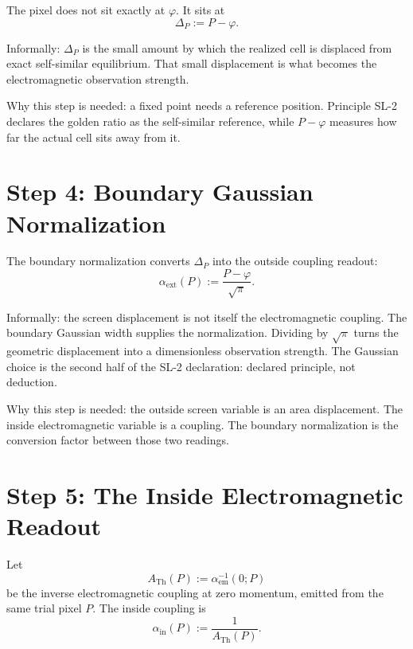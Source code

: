 \documentclass[11pt]{article}
\theoremstyle{remark}
\newcommand{\ATh}{A_{\mathrm{Th}}}
\begin{document}
The pixel does not sit exactly at \(\varphi\). It sits at
\begin{equation}
\Delta_P:=P-\varphi.
\label{eq:deltaP}
\end{equation}

Informally: \(\Delta_P\) is the small amount by which the realized cell is displaced from exact self-similar equilibrium. That small displacement is what becomes the electromagnetic observation strength.

Why this step is needed: a fixed point needs a reference position. Principle SL-2 declares the golden ratio as the self-similar reference, while \(P-\varphi\) measures how far the actual cell sits away from it.

\section{Step 4: Boundary Gaussian Normalization}

The boundary normalization converts \(\Delta_P\) into the outside coupling readout:
\begin{equation}
\alpha_{\mathrm{ext}}(P):=\frac{P-\varphi}{\sqrt\pi}.
\label{eq:alphaext}
\end{equation}

Informally: the screen displacement is not itself the electromagnetic coupling. The boundary Gaussian width supplies the normalization. Dividing by \(\sqrt\pi\) turns the geometric displacement into a dimensionless observation strength. The Gaussian choice is the second half of the SL-2 declaration: declared principle, not deduction.

Why this step is needed: the outside screen variable is an area displacement. The inside electromagnetic variable is a coupling. The boundary normalization is the conversion factor between those two readings.

\section{Step 5: The Inside Electromagnetic Readout}

Let
\begin{equation}
\ATh(P):=\alpha_{\mathrm{em}}^{-1}(0;P)
\label{eq:ATdef}
\end{equation}
be the inverse electromagnetic coupling at zero momentum, emitted from the same trial pixel \(P\). The inside coupling is
\begin{equation}
\alpha_{\mathrm{in}}(P):=\frac{1}{\ATh(P)}.
\label{eq:alphain}
\end{equation}
\end{document}
